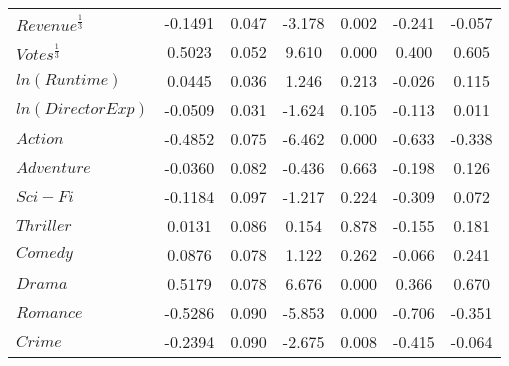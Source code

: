\begin{center}
\begin{tabular}{lcccccc}
                    \textbf{$Revenue^{\frac{1}{3}}$} & -0.1491       & 0.047            & -3.178     & 0.002               & -0.241          & -0.057          \\
                    \textbf{$Votes^{\frac{1}{3}}$}   & 0.5023        & 0.052            & 9.610      & 0.000               & 0.400           & 0.605           \\
                    \textbf{$ln(Runtime)$}           & 0.0445        & 0.036            & 1.246      & 0.213               & -0.026          & 0.115           \\
                    \textbf{$ln(Director Exp)$}      & -0.0509       & 0.031            & -1.624     & 0.105               & -0.113          & 0.011           \\
                    \textbf{$Action$}                & -0.4852       & 0.075            & -6.462     & 0.000               & -0.633          & -0.338          \\
                    \textbf{$Adventure$}             & -0.0360       & 0.082            & -0.436     & 0.663               & -0.198          & 0.126           \\
                    \textbf{$Sci-Fi$}                & -0.1184       & 0.097            & -1.217     & 0.224               & -0.309          & 0.072           \\
                    \textbf{$Thriller$}              & 0.0131        & 0.086            & 0.154      & 0.878               & -0.155          & 0.181           \\
                    \textbf{$Comedy$}                & 0.0876        & 0.078            & 1.122      & 0.262               & -0.066          & 0.241           \\
                    \textbf{$Drama$}                 & 0.5179        & 0.078            & 6.676      & 0.000               & 0.366           & 0.670           \\
                    \textbf{$Romance$}               & -0.5286       & 0.090            & -5.853     & 0.000               & -0.706          & -0.351          \\
                    \textbf{$Crime$}                 & -0.2394       & 0.090            & -2.675     & 0.008               & -0.415          & -0.064          \\
                    \bottomrule
                \end{tabular}
                \begin{tabular}{lclc}

\end{tabular}
\end{center}
